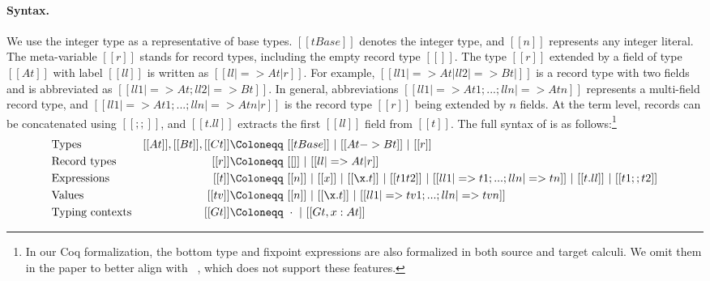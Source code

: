 \paragraph{Syntax.}
We use the integer type as a representative of base types. $[[tBase]]$ denotes
the integer type, and $[[n]]$ represents any integer literal. The meta-variable
$[[r]]$ stands for record types, including the empty record type $[[{}]]$. The
type $[[r]]$ extended by a field of type $[[At]]$ with label $[[ll]]$ is written
as $[[{ll |=>At | r}]]$. For example, $[[{ll1 |=>At | {ll2|=>Bt | {}}}]]$ is a
record type with two fields and is abbreviated as $[[ {ll1 |=>At; ll2|=>Bt} ]]$.
In general, abbreviations $[[ { ll1 |=>At1 ; ... ; lln |=>Atn } ]]$ represents a
multi-field record type, and $[[ { ll1 |=> At1 ; ... ; lln |=> Atn | r } ]]$ is
the record type $[[r]]$ being extended by $n$ fields. At the term level, records
can be concatenated using $[[;;]]$, and $[[t.ll ]]$ extracts the first $[[ll]]$
field from $[[t]]$. The full syntax of \lambdar is as follows:\footnote{In our
Coq formalization, the bottom type and fixpoint expressions are also formalized
in both source and target calculi. We omit them in the paper to better align
with \lambdaiplus~\citep{bi2018essence}, which does not support these features.}
{ \small
    \begin{align*}
      &\text{Types}        &[[At]], [[Bt]], [[Ct]] \Coloneqq&~ [[tBase]] ~|~ [[At -> Bt]] ~|~ [[r]]  \\
      &\text{Record types} &[[r]]  \Coloneqq&~ [[{}]] ~|~ [[{ll |=> At | r}]]  \\
      &\text{Expressions}  &[[t]]  \Coloneqq&~ [[n]] ~|~ [[x]] ~|~
                                              [[\x.t]] ~|~ [[t1 t2]]
                                              ~|~[[ { ll1 |=> t1 ;
                                                    ... ; lln |=> tn } ]] ~|~ [[t.ll ]]~|~ [[t1;;t2]] \\
      &\text{Values}       &[[tv]] \Coloneqq&~ [[n]] ~|~ [[\x.t]] ~|~ [[ { ll1 |=> tv1 ; ... ; lln |=> tvn } ]] \\
      &\text{Typing contexts} &[[Gt]] \Coloneqq&~  \cdot ~|~ [[ Gt, x:At ]] %
    \end{align*}
}

